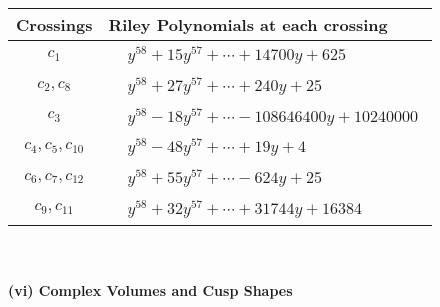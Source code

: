 \documentclass[1p]{elsarticle_modified}
\theoremstyle{definition}
\begin{document}
\begin{tabular}{m{50pt}|m{274pt}}
Crossings & \hspace{64pt}Riley Polynomials at each crossing \\
\hline $$\begin{aligned}c_{1}\end{aligned}$$&$\begin{aligned}
&y^{58}+15 y^{57}+\cdots+14700 y+625
\end{aligned}$\\
\hline $$\begin{aligned}c_{2},c_{8}\end{aligned}$$&$\begin{aligned}
&y^{58}+27 y^{57}+\cdots+240 y+25
\end{aligned}$\\
\hline $$\begin{aligned}c_{3}\end{aligned}$$&$\begin{aligned}
&y^{58}-18 y^{57}+\cdots-108646400 y+10240000
\end{aligned}$\\
\hline $$\begin{aligned}c_{4},c_{5},c_{10}\end{aligned}$$&$\begin{aligned}
&y^{58}-48 y^{57}+\cdots+19 y+4
\end{aligned}$\\
\hline $$\begin{aligned}c_{6},c_{7},c_{12}\end{aligned}$$&$\begin{aligned}
&y^{58}+55 y^{57}+\cdots-624 y+25
\end{aligned}$\\
\hline $$\begin{aligned}c_{9},c_{11}\end{aligned}$$&$\begin{aligned}
&y^{58}+32 y^{57}+\cdots+31744 y+16384
\end{aligned}$\\
\hline
\end{tabular}\\~\\
\newpage\flushleft \textbf{(vi) Complex Volumes and Cusp Shapes}
\end{document}
